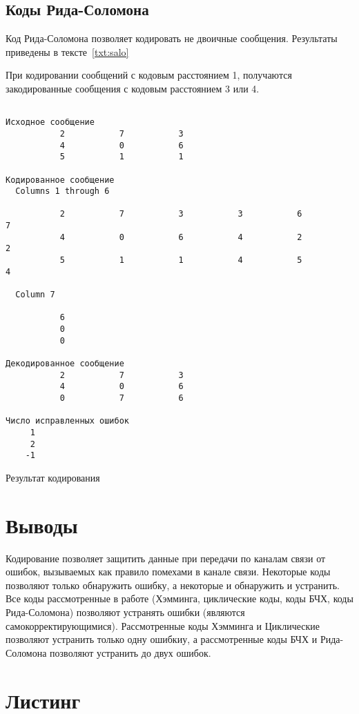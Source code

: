 \subsection{Коды Рида-Соломона}

Код Рида-Соломона позволяет кодировать не двоичные сообщения. Результаты приведены в тексте~\ref{txt:salo}

При кодировании сообщений с кодовым расстоянием 1, получаются закодированные сообщения с кодовым расстоянием 3 или 4.

\begin{program}
\begin{verbatim}

Исходное сообщение
           2           7           3
           4           0           6
           5           1           1

Кодированное сообщение
  Columns 1 through 6

           2           7           3           3           6           7
           4           0           6           4           2           2
           5           1           1           4           5           4

  Column 7

           6
           0
           0

Декодированное сообщение
           2           7           3
           4           0           6
           0           7           6

Число исправленных ошибок
     1
     2
    -1

\end{verbatim}
\caption{Результат кодирования}
\label{txt:salo}
\end{program}

\section{Выводы}

Кодирование позволяет защитить данные при передачи по каналам связи от ошибок, вызываемых как правило помехами
в канале связи. Некоторые коды позволяют только обнаружить ошибку, а некоторые и обнаружить и устранить.
Все коды рассмотренные в работе (Хэмминга, циклические коды, коды БЧХ, коды Рида-Соломона) позволяют устранять ошибки (являются самокорректирующимися). Рассмотренные коды Хэмминга и Циклические позволяют устранить только одну ошибкиу,
а рассмотренные коды БЧХ и Рида-Соломона позволяют устранить до двух ошибок.

\newpage
\section{Листинг}



